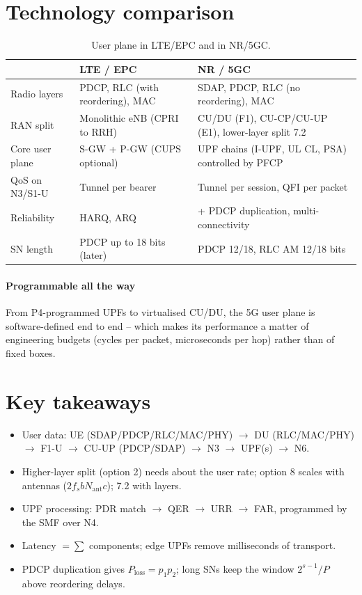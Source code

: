 \documentclass[11pt,a4paper]{article}
\begin{document}
\section{Technology comparison}
\begin{table}[htbp]
\centering\small
\caption{User plane in LTE/EPC and in NR/5GC.}\label{tab:cmp}
\begin{tabularx}{\linewidth}{@{}l Y Y@{}}
\toprule
{} & LTE / EPC & NR / 5GC \\
\midrule
Radio layers       & PDCP, RLC (with reordering), MAC & SDAP, PDCP, RLC (no reordering), MAC \\
RAN split          & Monolithic eNB (CPRI to RRH)     & CU/DU (F1), CU-CP/CU-UP (E1), lower-layer split 7.2 \\
Core user plane    & S-GW + P-GW (CUPS optional)      & UPF chains (I-UPF, UL CL, PSA) controlled by PFCP \\
QoS on N3/S1-U     & Tunnel per bearer                & Tunnel per session, QFI per packet \\
Reliability        & HARQ, ARQ                        & + PDCP duplication, multi-connectivity \\
SN length          & PDCP up to 18 bits (later)       & PDCP 12/18, RLC AM 12/18 bits \\
\bottomrule
\end{tabularx}
\end{table}

\paragraph{Programmable all the way} From P4-programmed UPFs to virtualised CU/DU, the 5G user plane is software-defined end to end -- which makes
its performance a matter of engineering budgets (cycles per packet, microseconds per hop) rather than of fixed boxes.

\section{Key takeaways}
\begin{takeawaybox}
\begin{itemize}
  \item User data: UE (SDAP/PDCP/RLC/MAC/PHY) $\to$ DU (RLC/MAC/PHY) $\to$ F1-U $\to$ CU-UP (PDCP/SDAP) $\to$ N3 $\to$ UPF(s) $\to$ N6.
  \item Higher-layer split (option 2) needs about the user rate; option 8 scales with antennas ($2f_s b N_{\mathrm{ant}} c$); 7.2 with layers.
  \item UPF processing: PDR match $\to$ QER $\to$ URR $\to$ FAR, programmed by the SMF over N4.
  \item Latency $= \sum$ components; edge UPFs remove milliseconds of transport.
  \item PDCP duplication gives $P_{\mathrm{loss}} = p_1p_2$; long SNs keep the window $2^{s-1}/P$ above reordering delays.
\end{itemize}
\end{takeawaybox}
\end{document}
